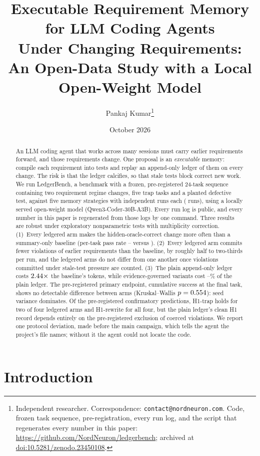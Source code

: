 \documentclass[11pt]{article}
\title{\textbf{Executable Requirement Memory\\
for LLM Coding Agents\\
Under Changing Requirements:\\
An Open-Data Study with a Local Open-Weight Model}}
\author{Pankaj Kumar\thanks{Independent researcher.
Correspondence: \texttt{contact@nordneuron.com}.
Code, frozen task sequence, pre-registration, every run log, and the script
that regenerates every number in this paper:
\url{https://github.com/NordNeuron/ledgerbench}; archived at
\href{https://doi.org/10.5281/zenodo.23450108}{doi:10.5281/zenodo.23450108}.}}
\date{October 2026}
\begin{document}
\maketitle

\begin{abstract}
An LLM coding agent that works across many sessions must carry earlier
requirements forward, and those requirements change. One proposal is an
\emph{executable} memory: compile each requirement into tests and replay an
append-only ledger of them on every change. The risk is that the ledger
calcifies, so that stale tests block correct new work. We run LedgerBench, a
benchmark with a frozen, pre-registered 24-task sequence containing two
requirement regime changes, five trap tasks and a planted defective test,
against five memory strategies with \NSeedsPerArm{} independent runs each
(\NNRuns{} runs), using a locally served open-weight model
(Qwen3-Coder-30B-A3B). Every run log is public, and every number in this paper
is regenerated from those logs by one command. Three results are robust under
exploratory nonparametric tests with multiplicity correction. (1)~Every
ledgered arm makes the hidden-oracle-correct change more often than a
summary-only baseline (per-task pass rate \NMOnePassD--\NMOnePassC{} versus
\NMOnePassA). (2)~Every ledgered arm commits fewer violations of earlier
requirements than the baseline, by roughly half to two-thirds per run, and the
ledgered arms do not differ from one another once violations committed under
stale-test pressure are counted. (3)~The plain append-only ledger costs
$2.44\times$ the baseline's tokens, while evidence-governed variants
cost \NTokPctOfBCplus--\NTokPctOfBD\% of the plain ledger. The pre-registered
primary endpoint, cumulative success at the final task, shows no detectable
difference between arms (Kruskal--Wallis $p=0.554$): seed
variance dominates. Of the pre-registered confirmatory predictions, H1-trap
holds for two of four ledgered arms and H1-rewrite for all four, but the plain
ledger's clean H1 record depends entirely on the pre-registered exclusion of
coerced violations. We report one protocol deviation, made before the main
campaign, which tells the agent the project's file names; without it the agent
could not locate the code.
\end{abstract}

\section{Introduction}
\end{document}
